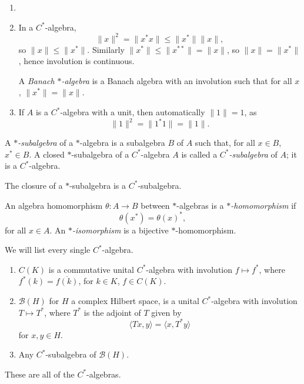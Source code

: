 \documentclass[12pt]{article}
\begin{document}
\begin{remark}
	\begin{enumerate}
		\item[]
		\item In a $C^{\ast}$-algebra,
			\[
			\|x\|^2 = \|x^{\ast} x\| \leq \|x^{\ast}\| \|x\|,
			\]
			so $\|x\| \leq \|x^{\ast}\|$. Similarly $\|x^{\ast}\| \leq \|x^{\ast\ast}\| = \|x\|$, so $\|x\| = \|x^{\ast}\|$, hence involution is continuous.

			A \emph{Banach $\ast$-algebra} is a Banach algebra with an involution such that for all $x$, $\|x^{\ast}\| = \|x\|$.
		\item If $A$ is a $C^{\ast}$-algebra with a unit, then automatically $\|1\| = 1$, as
			\[
			\|1\|^2 = \|1^{\ast} 1\| = \|1\|.
			\]
	\end{enumerate}
\end{remark}

\begin{definition}
	A \emph{$\ast$-subalgebra} of a $\ast$-algebra is a subalgebra $B$ of $A$ such that, for all $x \in B$, $x^{\ast} \in B$. A closed $\ast$-subalgebra of a $C^{\ast}$-algebra $A$ is called a \emph{$C^{\ast}$-subalgebra} of $A$; it is a $C^{\ast}$-algebra.

	The closure of a $\ast$-subalgebra is a $C^{\ast}$-subalgebra.

	An algebra homomorphism $\theta : A \to B$ between $\ast$-algebras is a \emph{$\ast$-homomorphism} if
	\[
	\theta(x^{\ast}) = \theta(x)^{\ast},
	\]
	for all $x \in A$. An \emph{$\ast$-isomorphism} is a bijective $\ast$-homomorphism.
\end{definition}


We will list every single $C^\ast$-algebra.

\begin{exbox}
	\begin{enumerate}
		\item $C(K)$ is a commutative unital $C^{\ast}$-algebra with involution $f \mapsto f^\ast$, where $f^{\ast}(k) = \overline{f(k)}$, for $k \in K$, $f \in C(K)$.
		\item  $\mathcal{B}(H)$ for $H$ a complex Hilbert space, is a unital $C^{\ast}$-algebra with involution $T \mapsto T^{\ast}$, where $T^{\ast}$ is the adjoint of $T$ given by
			\[
			\langle Tx, y \rangle = \langle x, T^{\ast} y \rangle
			\]
			for $x, y \in H$.
		\item Any $C^{\ast}$-subalgebra of $\mathcal{B}(H)$.
	\end{enumerate}
	These are all of the $C^{\ast}$-algebras.
\end{exbox}
\end{document}
